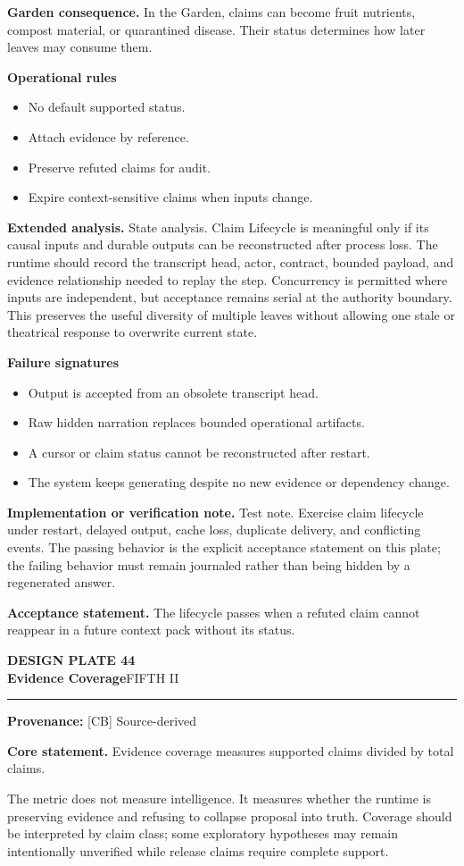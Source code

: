 \documentclass[10pt,letterpaper,oneside]{article}
\newcommand{\prov}[1]{\textcolor{gardenBlue}{\sffamily\footnotesize\textbf{Provenance:} #1}}
\newcommand{\platetitle}[3]{%
  \begin{minipage}[t][0.54in][t]{\textwidth}
  {\sffamily\bfseries\color{gardenDeep}\fontsize{9}{10}\selectfont DESIGN PLATE #1}\\[-1pt]
  {\sffamily\bfseries\color{gardenInk}\fontsize{16.5}{18}\selectfont #2}\hfill{\sffamily\color{gardenGreen}\large #3}
  \end{minipage}\vspace{-2pt}\hrule\vspace{5pt}}
\begin{document}
\textbf{Garden consequence.} In the Garden, claims can become fruit nutrients, compost material, or quarantined disease. Their status determines how later leaves may consume them.

\textbf{Operational rules}
\begin{itemize}
\item No default supported status.
\item Attach evidence by reference.
\item Preserve refuted claims for audit.
\item Expire context-sensitive claims when inputs change.
\end{itemize}
\textbf{Extended analysis.} State analysis. Claim Lifecycle is meaningful only if its causal inputs and durable outputs can be reconstructed after process loss. The runtime should record the transcript head, actor, contract, bounded payload, and evidence relationship needed to replay the step. Concurrency is permitted where inputs are independent, but acceptance remains serial at the authority boundary. This preserves the useful diversity of multiple leaves without allowing one stale or theatrical response to overwrite current state.

\textbf{Failure signatures}
\begin{itemize}
\item Output is accepted from an obsolete transcript head.
\item Raw hidden narration replaces bounded operational artifacts.
\item A cursor or claim status cannot be reconstructed after restart.
\item The system keeps generating despite no new evidence or dependency change.
\end{itemize}
\textbf{Implementation or verification note.} Test note. Exercise claim lifecycle under restart, delayed output, cache loss, duplicate delivery, and conflicting events. The passing behavior is the explicit acceptance statement on this plate; the failing behavior must remain journaled rather than being hidden by a regenerated answer.

\begin{acceptbox}
\textbf{Acceptance statement.} The lifecycle passes when a refuted claim cannot reappear in a future context pack without its status.
\end{acceptbox}
\newpage
\platetitle{44}{Evidence Coverage}{FIFTH II}
\prov{[CB] Source-derived}
\fontsize{8.85}{10.45}\selectfont
\begin{corebox}
\textbf{Core statement.} Evidence coverage measures supported claims divided by total claims.
\end{corebox}
The metric does not measure intelligence. It measures whether the runtime is preserving evidence and refusing to collapse proposal into truth. Coverage should be interpreted by claim class; some exploratory hypotheses may remain intentionally unverified while release claims require complete support.
\end{document}
